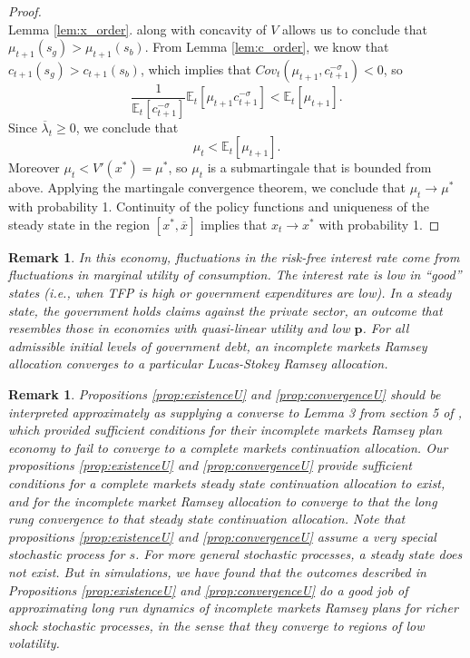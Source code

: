 \documentclass[12pt]{article}
\newcommand{\tjs}[1]{\textcolor{red}{$^{\textrm{tjs}}${#1}}}
\newcommand{\EE}{\mathbb E}
\newtheorem{remark}[theorem]{Remark}
\begin{document}
\begin{proof}
{\[\]  Lemma  \ref{lem:x_order}. along with concavity of $V$ allows us to conclude that $\mu_{t+1}(s_g) > \mu_{t+1}(s_b)$.  From Lemma \ref{lem:c_order}, we know that $c_{t+1}(s_g) > c_{t+1}(s_b)$, which implies that $Cov_t(\mu_{t+1},c_{t+1}^{-\sigma}) <0$, so
\[
	 \frac{1}{\EE_t[c_{t+1}^{-\sigma}]}\EE_t[\mu_{t+1}c_{t+1}^{-\sigma}]  < \EE_t[\mu_{t+1}].
\] Since $\overline \lambda_t \geq 0$, we  conclude that
\[
	\mu_t < \EE_t[\mu_{t+1}].
\]  Moreover $\mu_t < V'(x^*) = \mu^*$, so $\mu_t$ is a submartingale that is bounded from above.  Applying the martingale convergence theorem, we conclude that $\mu_t \rightarrow \mu^*$ with probability 1.  Continuity of the policy functions and uniqueness of the steady state in the region $[x^*,\overline x]$ implies that $x_t\rightarrow x^*$ with probability 1.}
\end{proof}

\begin{remark}
In this economy,  fluctuations in the risk-free  interest rate come from fluctuations in  marginal utility of consumption. The interest rate
 is low  in ``good'' states (i.e., when  TFP is high or government expenditures are low).
 In a steady state, the government holds claims against the private sector, an outcome that resembles those in economies
 with  quasi-linear utility and  low  $\bm{p}$.  For all admissible  initial  levels of government debt, an incomplete markets Ramsey allocation converges to a particular Lucas-Stokey  Ramsey allocation. 

\end{remark}
{
\begin{remark}  Propositions \ref{prop:existenceU}  and \ref{prop:convergenceU} should be interpreted approximately as supplying  a converse to Lemma 3 from section 5 of \citet{Aiyagari2002}, which  provided sufficient conditions for their incomplete markets Ramsey plan  economy to {\em fail} to converge to  a complete markets continuation allocation.  Our propositions \ref{prop:existenceU}  and \ref{prop:convergenceU} provide sufficient conditions for a complete markets steady state continuation allocation to exist, and for the incomplete market Ramsey allocation to converge to that
the long rung convergence to that steady state continuation allocation.  %
Note that propositions \ref{prop:existenceU}  and \ref{prop:convergenceU} assume a very special stochastic process for $s$.
  For more general stochastic processes, a steady state does not exist. But in simulations,  we have found that the outcomes described in Propositions \ref{prop:existenceU}  and \ref{prop:convergenceU} do a good job of approximating long run  dynamics of incomplete markets Ramsey plans for
 richer shock stochastic processes, in the sense that they converge to regions of low volatility. 
\end{remark}}
\end{document}

